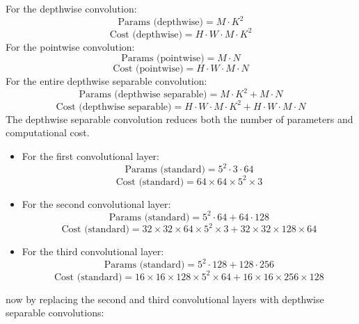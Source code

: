 \begin{qsolve}
    \begin{qsolve}[]
        For the depthwise convolution:
        \[
        \text{Params (depthwise)} = M \cdot K^2
        \]
        \[
        \text{Cost (depthwise)} = H \cdot W \cdot M \cdot K^2
        \]
        \splitqsolve[\splitqsolve]
        For the pointwise convolution:
        \[
        \text{Params (pointwise)} = M \cdot N
        \]
        \[
        \text{Cost (pointwise)} = H \cdot W \cdot M \cdot N
        \]
        For the entire depthwise separable convolution:
        \[
        \text{Params (depthwise separable)} = M \cdot K^2 + M \cdot N
        \]
        \[
        \text{Cost (depthwise separable)} = H \cdot W \cdot M \cdot K^2 + H \cdot W \cdot M \cdot N
        \]
        The depthwise separable convolution reduces both the number of parameters and computational cost.
        \begin{itemize}
            \item For the first convolutional layer:
            \[
            \text{Params (standard)} = 5^2 \cdot 3 \cdot 64
            \]
            \[
            \text{Cost (standard)} = 64 \times 64 \times 5^2 \times 3
            \]
            \item For the second convolutional layer:
            \[
            \text{Params (standard)} = 5^2 \cdot 64 + 64 \cdot 128
            \]
            \[
            \text{Cost (standard)} = 32 \times 32 \times 64 \times 5^2 \times 3 + 32 \times 32 \times 128 \times 64
            \]
            \item For the third convolutional layer:
            \[
            \text{Params (standard)} = 5^2 \cdot 128 + 128 \cdot 256
            \]
            \[
            \text{Cost (standard)} = 16 \times 16 \times 128 \times 5^2 \times 64 + 16 \times 16 \times 256 \times 128
            \]
        \end{itemize}

        now by replacing the second and third convolutional layers with depthwise separable convolutions:
        

\end{qsolve}
\end{qsolve}
